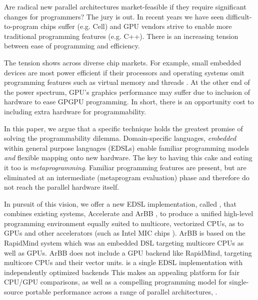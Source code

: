 Are radical new parallel architectures market-feasible if they require
significant changes for programmers?  The jury is out.  In recent
years we have seen difficult-to-program chips suffer 
(e.g. Cell)
and
GPU vendors strive to enable more traditional programming features
\cite{fermi} (e.g. C++).  There is an increasing
tension between ease of programming and efficiency.

The tension  shows  across diverse chip markets.  For example,
small embedded devices are most power efficient if their processors and operating systems
omit programming features such as virtual memory and threads \cite{tinyos}.  
At the other end of the power spectrum, GPU's
graphics performance may suffer due to inclusion of hardware to ease
GPGPU programming.  In short, there is an opportunity cost to
including extra hardware for programmability.

In this paper, we argue 
that a specific technique holds the greatest promise of solving the programmability dilemma.
%
Domain-specific languages, {\em embedded} within general purpose
languages (EDSLs) 
 enable familiar programming models 
{\em and} flexible
mapping onto new hardware.  The key to having this cake and eating it
too is {\em metaprogramming}.  Familiar programming features are
present, but are eliminated at an intermediate (metaprogram evaluation)
phase and therefore do not reach the parallel hardware itself.


In pursuit of this vision, we offer a
% 
 new EDSL implementation, called \accarbb{}, that combines
existing systems, Accelerate \cite{ACCELERATEDAMP11} and ArBB \cite{ArBB}, to produce a unified
high-level programming environment equally suited to multicore,
vectorized CPUs, as to GPUs and other accelerators (such as Intel MIC chips \cite{larrabee}).
%
ArBB is based on the RapidMind \cite{RapidMind} system which was an embedded 
DSL targeting multicore CPUs as well as GPUs. ArBB does not  include a GPU 
backend like RapidMind, targeting multicore CPUs and their vector 
units. 
\fi{}
\systemname{} is a single EDSL implementation 
with independently optimized backends 
This makes
\systemname{} an appealing platform for fair CPU/GPU comparisons, 
as well as a compelling programming model for single-source portable performance across a range of
parallel architectures, .


